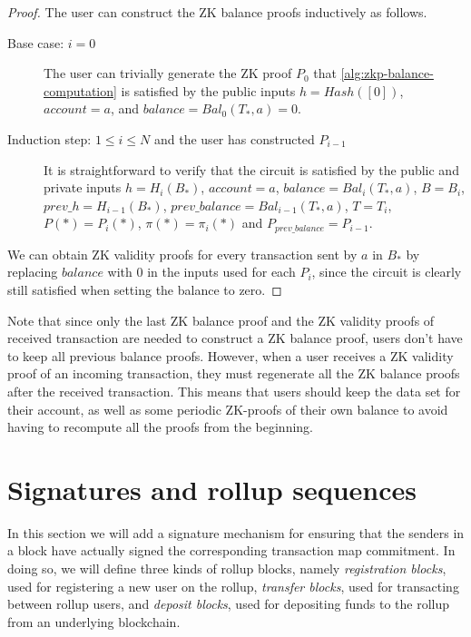 \begin{proof}
  The user can construct the ZK balance proofs inductively as follows.

\begin{description}
    \item[Base case: \(i = 0\)]
    The user can trivially generate the ZK proof \(P_0\) that \cref{alg:zkp-balance-computation} is satisfied by the public inputs \(h=Hash([0])\), \(account=a\), and \(balance=Bal_0(T_*,a)=0\).
    \item[Induction step: \(1 \leq i \leq N\) and the user has constructed \(P_{i-1}\)]
    It is straightforward to verify that the circuit is satisfied by the public and private inputs \(h=H_i(B_*)\), \(account=a\), \(balance=Bal_i(T_*,a)\), \(B = B_i\), \(prev\_h = H_{i-1}(B_*)\), \(prev\_balance = Bal_{i-1}(T_*,a)\), \(T = T_i\), \(P(*) = P_i(*)\), \(\pi(*)=\pi_i(*)\) and \(P_{prev\_balance} = P_{i-1}\).
  \end{description}
  We can obtain ZK validity proofs for every transaction sent by \(a\) in \(B_*\) by replacing \(balance\) with 0 in the inputs used for each \(P_i\), since the circuit is clearly still satisfied when setting the balance to zero.
  \end{proof}

Note that since only the last ZK balance proof and the ZK validity proofs of received transaction are needed to construct a ZK balance proof, users don't have to keep all previous balance proofs. However, when a user receives a ZK validity proof of an incoming transaction, they must regenerate all the ZK balance proofs after the received transaction. This means that users should keep the data set for their account, as well as some periodic ZK-proofs of their own balance to avoid having to recompute all the proofs from the beginning.

\section{Signatures and rollup sequences}\label{section:signatures}

In this section we will add a signature mechanism for ensuring that the senders in a block have actually signed the corresponding transaction map commitment. In doing so, we will define three kinds of rollup blocks, namely \emph{registration blocks}, used for registering a new user on the rollup, \emph{transfer blocks}, used for transacting between rollup users, and \emph{deposit blocks}, used for depositing funds to the rollup from an underlying blockchain.

